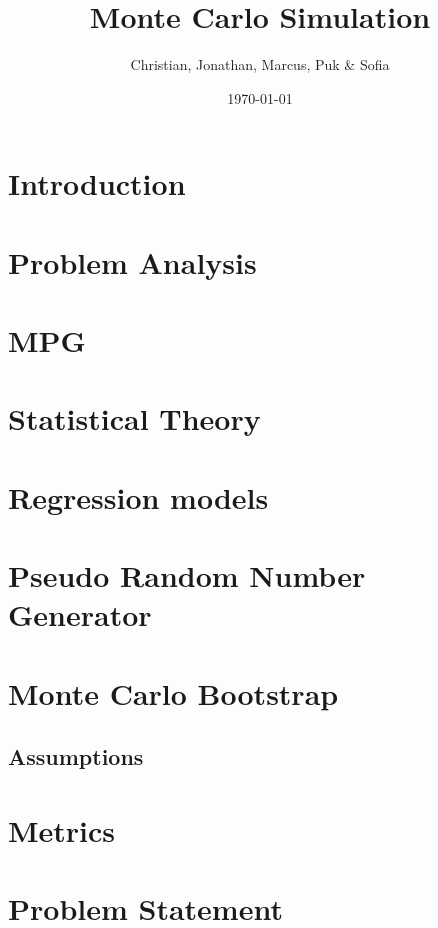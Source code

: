 \documentclass{article}
\title{Monte Carlo Simulation}
\author{Christian, Jonathan, Marcus, Puk \& Sofia }
\date{\today}
\begin{document}
	
	
	\setcounter{section}{0}
	\maketitle
	\newpage
	\tableofcontents
	\newpage
	
	\section{Introduction}
	
	\newpage
	
	\section{Problem Analysis}
	
	\newpage
	
	\section{MPG}
	
	\newpage
	
	\section{Statistical Theory}
	
	\newpage
	
	\section{Regression models}
 	
	\newpage
	
	
	\section{Pseudo Random Number Generator}
	
	\newpage
	
	\section{Monte Carlo Bootstrap}
	\subsection{Assumptions}
	\newpage
	\section{Metrics}
	
	\newpage

	
	\section{Problem Statement}
	
	\newpage
%	
\end{document}
